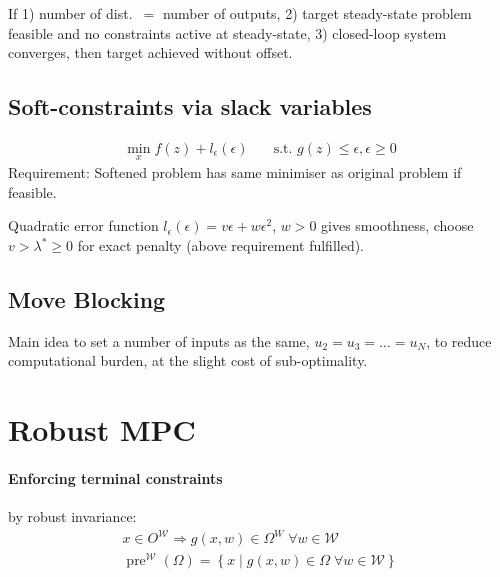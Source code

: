 \documentclass[landscape,a4paper,8pt]{scrartcl}
\renewcommand{\implies}{\Rightarrow}
\newcommand{\mc}[1]{\mathcal{#1}}
\DeclareMathOperator\pre{pre}
\begin{document}
\begin{multicols*}{3}
If 1) number of dist.\ $=$ number of outputs, 2) target steady-state problem feasible and no constraints active at steady-state, 3) closed-loop system converges, then target achieved without offset.


\subsection{Soft-constraints via slack variables}
\begin{align*}
\min_x f(z) + l_\epsilon(\epsilon) & \quad \text{s.t.\ } g(z) \leq \epsilon, \epsilon \geq 0
\end{align*}
Requirement: Softened problem has same minimiser as original problem if feasible.

Quadratic error function $l_\epsilon(\epsilon) = v\epsilon + w\epsilon^2$, $w > 0$ gives smoothness, choose $v > \lambda^* \geq 0$ for exact penalty (above requirement fulfilled).

\subsection{Move Blocking}
Main idea to set a number of inputs as the same, $u_2 = u_3 = \dots = u_N$, to reduce computational burden, at the slight cost of sub-optimality.

\section{Robust MPC}
\paragraph{Enforcing terminal constraints} by robust invariance:
\begin{align*}
x \in O^{\mc W} \implies g(x, w) \in \Omega^W \; \forall w \in \mc W \\
\pre^{\mc W}(\Omega) = \left\{ x \middle| g(x, w) \in \Omega \; \forall w \in \mc W\right\}
\end{align*}


\end{multicols*}
\end{document}
